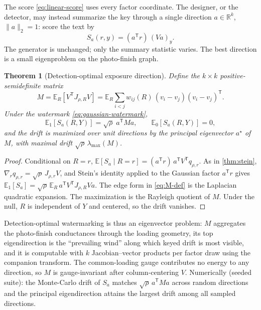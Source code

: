 \documentclass[11pt]{article}
\newtheorem{theorem}{Theorem}[section]
\theoremstyle{definition}
\theoremstyle{remark}
\newcommand{\R}{\mathbb{R}}
\newcommand{\E}{\mathbb{E}}
\newcommand{\trans}{\mathsf{T}}
\begin{document}
The score \eqref{eq:linear-score} uses every factor coordinate. The
designer, or the detector, may instead summarize the key through a
single direction $a\in\R^k$, $\|a\|_2=1$: score the text by
\begin{equation}
S_a(r,y)=(a^\trans r)\,(Va)_y .
\label{eq:directional-score}
\end{equation}
The generator is unchanged; only the summary statistic varies. The best
direction is a small eigenproblem on the photo-finish graph.

\begin{theorem}[Detection-optimal exposure direction]
\label{thm:eigen}
Define the $k\times k$ positive-semidefinite matrix
\begin{equation}
M=\E_R\!\left[V^\trans J_{\rho,R}V\right]
=\E_R\sum_{i<j}w_{ij}(R)\,(v_i-v_j)(v_i-v_j)^\trans .
\label{eq:M-def}
\end{equation}
Under the watermark \eqref{eq:gaussian-watermark},
\begin{equation}
\E_1[S_a(R,Y)]=\sqrt{\rho}\;a^\trans M a,
\qquad
\E_0[S_a(R,Y)]=0,
\end{equation}
and the drift is maximized over unit directions by the principal
eigenvector $a^\star$ of $M$, with maximal drift
$\sqrt{\rho}\,\lambda_{\max}(M)$.
\end{theorem}

\begin{proof}
Conditional on $R=r$, $\E[S_a\mid R=r]=(a^\trans r)\,a^\trans
V^\trans q_{\rho,r}$. As in \cref{thm:stein}, $\nabla_r
q_{\rho,r}=\sqrt{\rho}\,J_{\rho,r}V$, and Stein's identity applied to
the Gaussian factor $a^\trans r$ gives
$\E_1[S_a]=\sqrt{\rho}\,\E_R\,a^\trans V^\trans J_{\rho,R}Va$. The
edge form in \eqref{eq:M-def} is the Laplacian quadratic expansion. The
maximization is the Rayleigh quotient of $M$. Under the null, $R$ is
independent of $Y$ and centered, so the drift vanishes.
\end{proof}

Detection-optimal watermarking is thus an eigenvector problem: $M$
aggregates the photo-finish conductances through the loading geometry,
its top eigendirection is the ``prevailing wind'' along which keyed
drift is most visible, and it is computable with $k$ Jacobian--vector
products per factor draw using the companion transform. The
common-loading gauge contributes no energy to any direction, so $M$ is
gauge-invariant after column-centering $V$. Numerically (seeded suite):
the Monte-Carlo drift of $S_a$ matches $\sqrt{\rho}\,a^\trans Ma$
across random directions and the principal eigendirection attains the
largest drift among all sampled directions.
\end{document}
